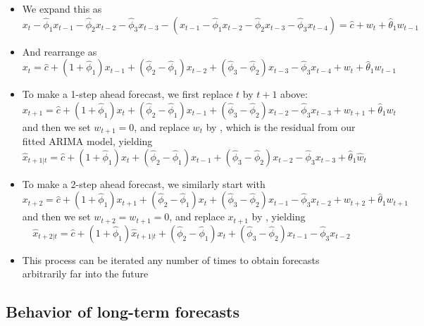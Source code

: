 \documentclass{article}
\begin{document}
\begin{itemize}
\item We expand this as 
  \[
  x_t - \hat\phi_1 x_{t-1} - \hat\phi_2 x_{t-2} - \hat\phi_3 x_{t-3} - 
  (x_{t-1} - \hat\phi_1 x_{t-2} - \hat\phi_2 x_{t-3} - \hat\phi_3 x_{t-4}) = 
  \hat{c} + w_t + \hat\theta_1 w_{t-1}
  \]

\item And rearrange as
  \[
  x_t = \hat{c} + (1 + \hat\phi_1) x_{t-1} + (\hat\phi_2 - \hat\phi_1) x_{t-2} + 
  (\hat\phi_3 - \hat\phi_2) x_{t-3} - \hat\phi_3 x_{t-4} + w_t + \hat\theta_1
  w_{t-1} 
  \]

\item To make a 1-step ahead forecast, we first replace $t$ by $t+1$ above:  
  \[
  x_{t+1} = \hat{c} + (1 + \hat\phi_1) x_t + (\hat\phi_2 - \hat\phi_1) x_{t-1} + 
  (\hat\phi_3 - \hat\phi_2) x_{t-2} - \hat\phi_3 x_{t-3} + w_{t+1} +
  \hat\theta_1 w_t  
  \]
  and then we set $w_{t+1} = 0$, and replace $w_t$ by , which
  is the residual from our fitted ARIMA model, yielding 
  \[
  \hat{x}_{t+1 | t} = \hat{c} + (1 + \hat\phi_1) x_t + (\hat\phi_2 - \hat\phi_1)
  x_{t-1} + (\hat\phi_3 - \hat\phi_2) x_{t-2} - \hat\phi_3 x_{t-3} +
  \hat\theta_1 \hat{w}_t  
  \]

\item To make a 2-step ahead forecast, we similarly start with 
  \[
  x_{t+2} = \hat{c} + (1 + \hat\phi_1) x_{t+1} + (\hat\phi_2 - \hat\phi_1) x_t +
  (\hat\phi_3 - \hat\phi_2) x_{t-1} - \hat\phi_3 x_{t-2} + w_{t+2} +
  \hat\theta_1 w_{t+1}
  \]
  and then we set $w_{t+2} = w_{t+1} = 0$, and replace $x_{t+1}$ by
  , yielding  
  \[
  \hat{x}_{t+2 | t} = \hat{c} + (1 + \hat\phi_1) \hat{x}_{t+1 | t} + (\hat\phi_2
  - \hat\phi_1) x_t + (\hat\phi_3 - \hat\phi_2) x_{t-1} - \hat\phi_3 x_{t-2}  
  \]

\item This process can be iterated any number of times to obtain forecasts
  arbitrarily far into the future 
\end{itemize}

\subsection{Behavior of long-term forecasts}
\end{document}

